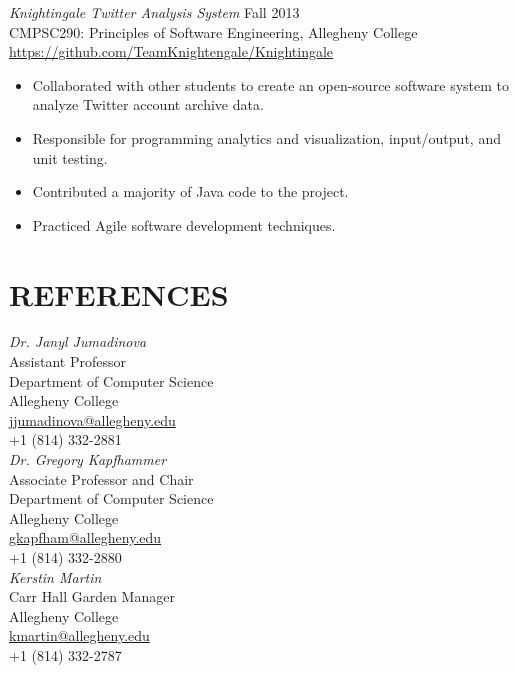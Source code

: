 \documentclass[margin]{res}
\begin{document}
\begin{resume}
                {\sl Knightingale Twitter Analysis System} \hfill Fall 2013 \\
                CMPSC290: Principles of Software Engineering, Allegheny College \\
                \url{https://github.com/TeamKnightengale/Knightingale}
                 \begin{itemize}  \itemsep -2pt %
                    \item Collaborated with other students to create an open-source software system to analyze Twitter account archive data.
                    \item Responsible for programming analytics and visualization, input/output, and unit testing.
                    \item Contributed a majority of Java code to the project.
                    \item Practiced Agile software development techniques.
                \end{itemize}

\section{REFERENCES}
{\sl Dr. Janyl Jumadinova} \hfill \\
Assistant Professor \\ Department of Computer Science \\ Allegheny College \\
\url{jjumadinova@allegheny.edu} \\
+1 (814) 332-2881 \\

{\sl Dr. Gregory Kapfhammer} \hfill \\
Associate Professor and Chair \\ Department of Computer Science \\ Allegheny College \\
\url{gkapfham@allegheny.edu} \\
+1 (814) 332-2880\\

{\sl Kerstin Martin} \hfill \\
Carr Hall Garden Manager \\ Allegheny College \\
\url{kmartin@allegheny.edu} \\
+1 (814) 332-2787\\


\end{resume} 
\end{document}
